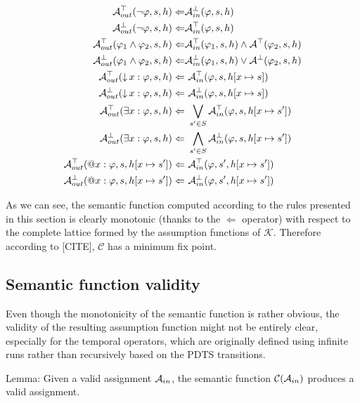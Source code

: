 \begin{align*}
	\assumeT_{out}(\neg \varphi, s, h) \Leftarrow & \assumeF_{in}(\varphi, s, h) \\
	\assumeF_{out}(\neg \varphi, s, h) \Leftarrow & \assumeT_{in}(\varphi, s, h) \\
	\assumeT_{out}(\varphi_1 \land \varphi_2, s, h) \Leftarrow & \assumeT_{in}(\varphi_1, s, h) \land \assumeT(\varphi_2, s, h) \\
	\assumeF_{out}(\varphi_1 \land \varphi_2, s, h) \Leftarrow & \assumeF_{in}(\varphi_1, s, h) \lor \assumeF(\varphi_2, s, h) \\
	\assumeT_{out}(\hctlBind{x} \varphi, s, h) \Leftarrow &\ \assumeT_{in}(\varphi, s, h[x \mapsto s]) \\
	\assumeF_{out}(\hctlBind{x} \varphi, s, h) \Leftarrow &\ \assumeF_{in}(\varphi, s, h[x \mapsto s]) \\
	\assumeT_{out}(\hctlExists{x} \varphi, s, h) \Leftarrow &\ \bigvee_{s' \in S} \assumeT_{in}(\varphi, s, h[x \mapsto s']) \\
	\assumeF_{out}(\hctlExists{x} \varphi, s, h) \Leftarrow &\ \bigwedge_{s' \in S} \assumeF_{in}(\varphi, s, h[x \mapsto s']) \\
	\assumeT_{out}(\hctlAt{x} \varphi, s, h[x \mapsto s']) \Leftarrow &\ \assumeT_{in}(\varphi, s', h[x \mapsto s']) \\
	\assumeF_{out}(\hctlAt{x} \varphi, s, h[x \mapsto s']) \Leftarrow &\ \assumeF_{in}(\varphi, s', h[x \mapsto s']) \\
\end{align*}

As we can see, the semantic function computed according to the rules presented in this section is clearly monotonic (thanks to the $\Leftarrow$ operator) with respect to the complete lattice formed by the assumption functions of $\mathcal{K}$. Therefore according to [CITE], $\mathcal{C}$ has a minimum fix point.

\subsection{Semantic function validity}

Even though the monotonicity of the semantic function is rather obvious, the validity of the resulting assumption function might not be entirely clear, especially for the temporal operators, which are originally defined using infinite runs rather than recursively based on the \ac{PDTS} transitions.

Lemma: Given a valid assignment $\mathcal{A}_{in}$, the semantic function $\mathcal{C}(\mathcal{A}_{in})$ produces a valid assignment.

